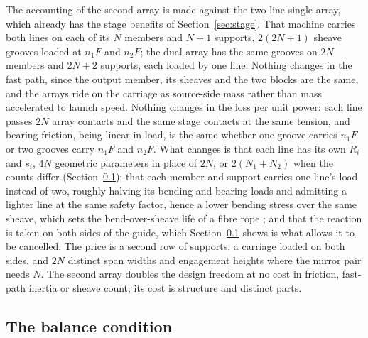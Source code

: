 \documentclass[preprint,12pt,number]{elsarticle}
\begin{document}
The accounting of the second array is made against the two-line single array, which already has the stage benefits of Section~\ref{sec:stage}. That machine carries both lines on each of its $N$ members and $N+1$ supports, $2(2N+1)$ sheave grooves loaded at $n_1 F$ and $n_2 F$; the dual array has the same grooves on $2N$ members and $2N+2$ supports, each loaded by one line. Nothing changes in the fast path, since the output member, its sheaves and the two blocks are the same, and the arrays ride on the carriage as source-side mass rather than mass accelerated to launch speed. Nothing changes in the loss per unit power: each line passes $2N$ array contacts and the same stage contacts at the same tension, and bearing friction, being linear in load, is the same whether one groove carries $n_1 F$ or two grooves carry $n_1 F$ and $n_2 F$. What changes is that each line has its own $R_i$ and $s_i$, $4N$ geometric parameters in place of $2N$, or $2(N_1 + N_2)$ when the counts differ (Section~\ref{sec:cond}); that each member and support carries one line's load instead of two, roughly halving its bending and bearing loads and admitting a lighter line at the same safety factor, hence a lower bending stress over the same sheave, which sets the bend-over-sheave life of a fibre rope \citep{davies2015,feyrer2015}; and that the reaction is taken on both sides of the guide, which Section~\ref{sec:cond} shows is what allows it to be cancelled. The price is a second row of supports, a carriage loaded on both sides, and $2N$ distinct span widths and engagement heights where the mirror pair needs $N$. The second array doubles the design freedom at no cost in friction, fast-path inertia or sheave count; its cost is structure and distinct parts.

\subsection{The balance condition}
\label{sec:cond}
\end{document}
